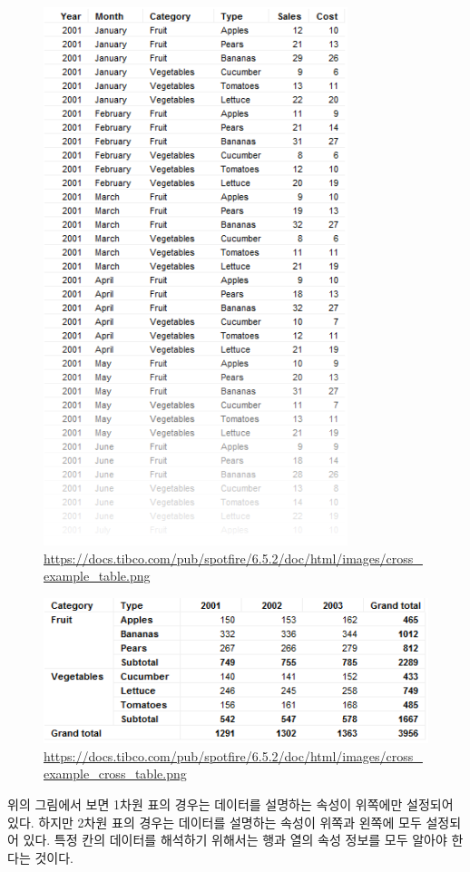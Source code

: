 \documentclass[
]{article}
\begin{document}
\begin{figure}
\centering
\includegraphics{cross_example_table.png}
\caption{\url{https://docs.tibco.com/pub/spotfire/6.5.2/doc/html/images/cross_example_table.png}}
\end{figure}

\begin{figure}
\centering
\includegraphics{cross_example_cross_table.png}
\caption{\url{https://docs.tibco.com/pub/spotfire/6.5.2/doc/html/images/cross_example_cross_table.png}}
\end{figure}

위의 그림에서 보면 1차원 표의 경우는 데이터를 설명하는 속성이 위쪽에만
설정되어 있다. 하지만 2차원 표의 경우는 데이터를 설명하는 속성이 위쪽과
왼쪽에 모두 설정되어 있다. 특정 칸의 데이터를 해석하기 위해서는 행과
열의 속성 정보를 모두 알아야 한다는 것이다.
\end{document}

